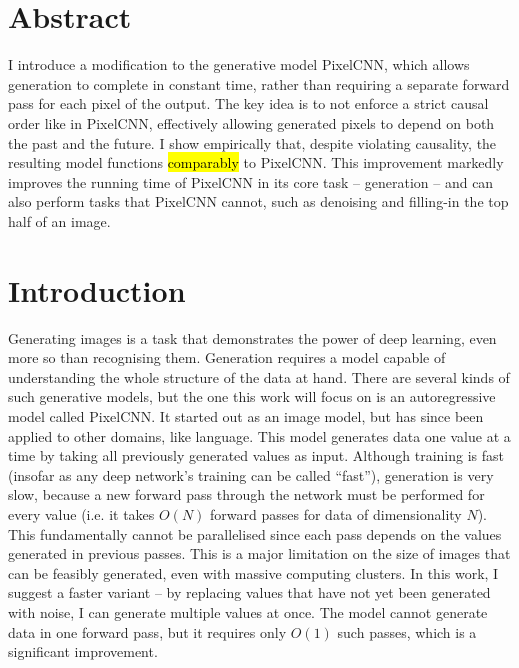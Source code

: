 \documentclass[11pt, a4paper, openany]{book}
\newcommand{\nquote}[1]{``{#1}''}
\begin{document}
\pagestyle{headings}
\chapter*{Abstract}
\vspace{-1em}
I introduce a modification to the generative model PixelCNN, which allows generation to complete in constant time, rather than requiring a separate forward pass for each pixel of the output. The key idea is to not enforce a strict causal order like in PixelCNN, effectively allowing generated pixels to depend on both the past and the future. I show empirically that, despite violating causality, the resulting model functions \hl{comparably} to PixelCNN. This improvement markedly improves the running time of PixelCNN in its core task -- generation -- and can also perform tasks that PixelCNN cannot, such as denoising and filling-in the top half of an image.

\pagestyle{headings}
\tableofcontents
\listoffigures
\listoftables

\mainmatter

\chapter{Introduction}
\label{cha:intro}

Generating images is a task that demonstrates the power of deep learning, even more so than recognising them. Generation requires a model capable of understanding the whole structure of the data at hand. There are several kinds of such generative models, but the one this work will focus on is an autoregressive model called PixelCNN. It started out as an image model, but has since been applied to other domains, like language. This model generates data one value at a time by taking all previously generated values as input. Although training is fast (insofar as any deep network's training can be called \nquote{fast}), generation is very slow, because a new forward pass through the network must be performed for every value (i.e. it takes $O(N)$ forward passes for data of dimensionality $N$). This fundamentally cannot be parallelised since each pass depends on the values generated in previous passes. This is a major limitation on the size of images that can be feasibly generated, even with massive computing clusters. In this work, I suggest a faster variant -- by replacing values that have not yet been generated with noise, I can generate multiple values at once. The model cannot generate data in one forward pass, but it requires only $O(1)$ such passes, which is a significant improvement.
\end{document}
